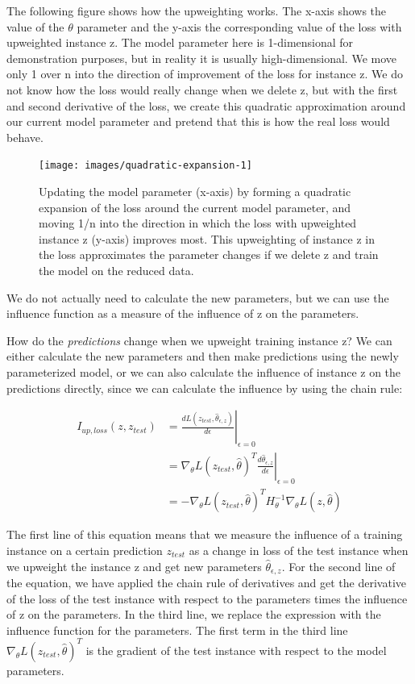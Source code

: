 \documentclass[
  12pt,
]{krantz}
\begin{document}
The following figure shows how the upweighting works.
The x-axis shows the value of the \(\theta\) parameter and the y-axis the corresponding value of the loss with upweighted instance z.
The model parameter here is 1-dimensional for demonstration purposes, but in reality it is usually high-dimensional.
We move only 1 over n into the direction of improvement of the loss for instance z.
We do not know how the loss would really change when we delete z, but with the first and second derivative of the loss, we create this quadratic approximation around our current model parameter and pretend that this is how the real loss would behave.

\begin{figure}

{\centering \texttt{[image: images/quadratic-expansion-1]} 

}

\caption{Updating the model parameter (x-axis) by forming a quadratic expansion of the loss around the current model parameter, and moving 1/n into the direction in which the loss with upweighted instance z (y-axis) improves most. This upweighting of instance z in the loss approximates the parameter changes if we delete z and train the model on the reduced data.}\label{fig:quadratic-expansion}
\end{figure}

We do not actually need to calculate the new parameters, but we can use the influence function as a measure of the influence of z on the parameters.

How do the \emph{predictions} change when we upweight training instance z?
We can either calculate the new parameters and then make predictions using the newly parameterized model, or we can also calculate the influence of instance z on the predictions directly, since we can calculate the influence by using the chain rule:

\begin{align*}I_{up,loss}(z,z_{test})&=\left.\frac{d{}L(z_{test},\hat{\theta}_{\epsilon,z})}{d\epsilon}\right|_{\epsilon=0}\\&=\left.\nabla_{\theta}L(z_{test},\hat{\theta})^T\frac{d\hat{\theta}_{\epsilon,z}}{d\epsilon}\right|_{\epsilon=0}\\&=-\nabla_{\theta}L(z_{test},\hat{\theta})^T{}H^{-1}_{\theta}\nabla_{\theta}L(z,\hat{\theta})\end{align*}

The first line of this equation means that we measure the influence of a training instance on a certain prediction \(z_{test}\) as a change in loss of the test instance when we upweight the instance z and get new parameters \(\hat{\theta}_{\epsilon,z}\).
For the second line of the equation, we have applied the chain rule of derivatives and get the derivative of the loss of the test instance with respect to the parameters times the influence of z on the parameters.
In the third line, we replace the expression with the influence function for the parameters.
The first term in the third line \(\nabla_{\theta}L(z_{test},\hat{\theta})^T{}\) is the gradient of the test instance with respect to the model parameters.
\end{document}

